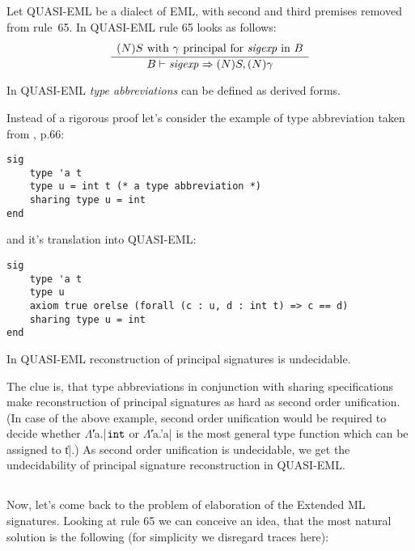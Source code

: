 \subsection{\secquasi}
\label{sec:quasi}

Let QUASI-EML be a dialect of EML, with second and third premises removed from rule~65.
In QUASI-EML rule 65 looks as follows:
$$
\frac{\begin{array}{c}
\mbox{$(N)S$ with $\gamma$ principal for ${\it sigexp}$ in $B$}\\
     \end{array}}
     {B\vdash{\it sigexp}\Rightarrow (N)S,(N)\gamma}
$$

\begin{lem}
In QUASI-EML \emph{type abbreviations} can be defined as derived forms.
\end{lem}

Instead of a rigorous proof let's consider the example of type abbreviation taken from \cite{MT91}, p.66:
\begin{verbatim}
sig
    type 'a t
    type u = int t (* a type abbreviation *)
    sharing type u = int
end
\end{verbatim}
and it's translation into QUASI-EML:
\begin{verbatim}
sig
    type 'a t
    type u
    axiom true orelse (forall (c : u, d : int t) => c == d)
    sharing type u = int
end
\end{verbatim}

\begin{cor}
In QUASI-EML reconstruction of principal signatures is undecidable.
\end{cor}

The clue is, that type abbreviations in conjunction with sharing specifications
make reconstruction of principal signatures as hard as second order unification. 
(In case of the above example, second order unification would be required
to decide whether $\Lambda$\|'a.|$\mbox{\tt int}$ or $\Lambda$\|'a.'a| is the most general type function
which can be assigned to \|t|.) As second order unification is undecidable, we get the
undecidability of principal signature reconstruction in QUASI-EML.

\subsection{\secnaive}
\label{sec:naive}

Now, let's come back to the problem of elaboration of the Extended ML signatures.
Looking at rule 65 we can conceive an idea, that the most natural solution is the following
(for simplicity we disregard traces here):

